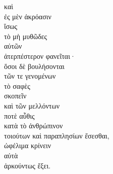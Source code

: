 {\large
\begin{greek}
\noindent καὶ \\
ἐς μὲν ἀκρόασιν \\
ἴσως \\
τὸ μὴ μυθῶδες \\
\tabto{2em} αὐτῶν \\
ἀτερπέστερον φανεῖται·\\

\noindent ὅσοι δὲ βουλήσονται \\
\tabto{2em} τῶν τε γενομένων\\
\tabto{4em} τὸ σαφὲς \\
\tabto{4em} σκοπεῖν \\
\tabto{2em} καὶ τῶν μελλόντων \\
\tabto{4em} ποτὲ αὖθις \\
\tabto{4em} κατὰ τὸ ἀνθρώπινον \\
\tabto{4em} τοιούτων καὶ παραπλησίων ἔσεσθαι, \\
\tabto{2em} ὠφέλιμα κρίνειν \\
\tabto{2em} αὐτὰ \\
ἀρκούντως ἕξει.\\

\end{greek}
}


